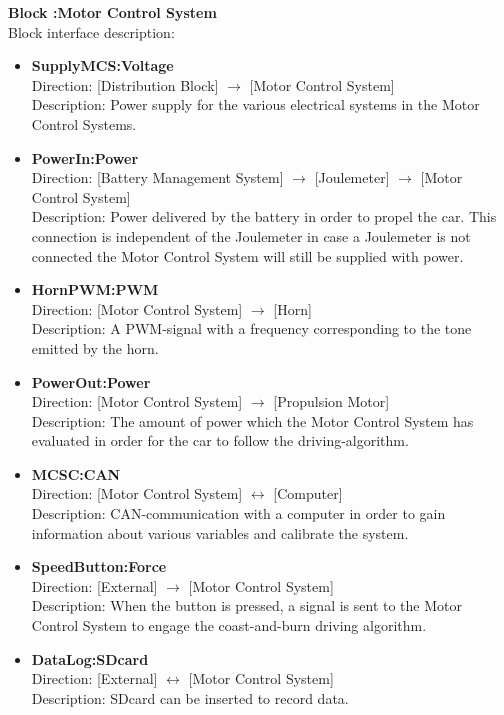 \textbf{Block :Motor Control System}\\
Block interface description:
\begin{itemize}
	\item \textbf{SupplyMCS:Voltage}\\
	Direction: [Distribution Block] $\rightarrow$ [Motor Control System]\\
	Description: Power supply for the various electrical systems in the Motor Control Systems.
	\item \textbf{PowerIn:Power}\\
	Direction: [Battery Management System] $\rightarrow$ [Joulemeter] $\rightarrow$ [Motor Control System]\\
	Description: Power delivered by the battery in order to propel the car. This connection is independent of the Joulemeter in case a Joulemeter is not connected the Motor Control System will still be supplied with power.
	\item \textbf{HornPWM:PWM}\\
	Direction: [Motor Control System] $\rightarrow$ [Horn]\\
	Description: A PWM-signal with a frequency corresponding to the tone emitted by the horn.
	\item \textbf{PowerOut:Power}\\
	Direction: [Motor Control System] $\rightarrow$ [Propulsion Motor]\\
	Description: The amount of power which the Motor Control System has evaluated in order for the car to follow the driving-algorithm.
	\item \textbf{MCSC:CAN}\\
	Direction: [Motor Control System] $\leftrightarrow$ [Computer]\\
	Description: CAN-communication with a computer in order to gain information about various variables and calibrate the system.
	\item \textbf{SpeedButton:Force}\\
	Direction: [External] $\rightarrow$ [Motor Control System]\\
	Description: When the button is pressed, a signal is sent to the Motor Control System to engage the coast-and-burn driving algorithm.
	\item \textbf{DataLog:SDcard}\\
	Direction: [External] $\leftrightarrow$ [Motor Control System]\\
	Description: SDcard can be inserted to record data.
\end{itemize}

